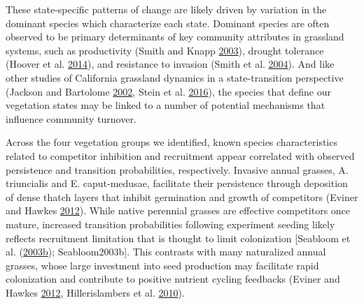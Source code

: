 \documentclass[twoside,12pt,final]{ucthesis-CA2012}
\begin{document}
\begin{ucmainmatter}
These state-specific patterns of change are likely driven by variation in the dominant species which characterize each state.
Dominant species are often observed to be primary determinants of key community attributes in grassland systems, such as productivity (Smith and Knapp \protect\hyperlink{ref-Smith2003}{2003}), drought tolerance (Hoover et al. \protect\hyperlink{ref-Hoover2014}{2014}), and resistance to invasion (Smith et al. \protect\hyperlink{ref-Smith2004}{2004}).
And like other studies of California grassland dynamics in a state-transition perspective (Jackson and Bartolome \protect\hyperlink{ref-Jackson2002}{2002}, Stein et al. \protect\hyperlink{ref-Stein2016}{2016}), the species that define our vegetation states may be linked to a number of potential mechanisms that influence community turnover.

Across the four vegetation groups we identified, known species characteristics related to competitor inhibition and recruitment appear correlated with observed persistence and transition probabilities, respectively.
Invasive annual grasses, A. triuncialis and E. caput-medusae, facilitate their persistence through deposition of dense thatch layers that inhibit germination and growth of competitors (Eviner and Hawkes \protect\hyperlink{ref-Eviner2012}{2012}).
While native perennial grasses are effective competitors once mature, increased transition probabilities following experiment seeding likely reflects recruitment limitation that is thought to limit colonization {[}Seabloom et al. (\protect\hyperlink{ref-Seabloom2003a}{2003}\protect\hyperlink{ref-Seabloom2003a}{b}); Seabloom2003b{]}.
This contrasts with many naturalized annual grasses, whose large investment into seed production may facilitate rapid colonization and contribute to positive nutrient cycling feedbacks (Eviner and Hawkes \protect\hyperlink{ref-Eviner2012}{2012}, Hillerislambers et al. \protect\hyperlink{ref-Hillerislambers2010}{2010}).


\end{ucmainmatter}
\end{document}
